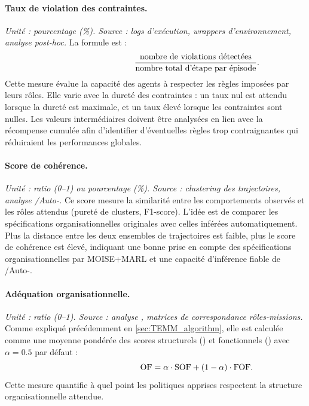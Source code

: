 \paragraph{Taux de violation des contraintes.}
\textit{Unité : pourcentage (\%). Source : logs d'exécution, wrappers d'environnement, analyse post-hoc.}
La formule est :
\[
  \hspace{3.5cm}\frac{\text{nombre de violations détectées}}{\text{nombre total d'étape par épisode}}.
\]
Cette mesure évalue la capacité des agents à respecter les règles imposées par leurs rôles.
Elle varie avec la dureté des contraintes : un taux nul est attendu lorsque la dureté est maximale, et un taux élevé lorsque les contraintes sont nulles.
Les valeurs intermédiaires doivent être analysées en lien avec la récompense cumulée afin d'identifier d'éventuelles règles trop contraignantes qui réduiraient les performances globales.

\paragraph{Score de cohérence.}
\textit{Unité : ratio (0–1) ou pourcentage (\%). Source : clustering des trajectoires, analyse /Auto-.}
Ce score mesure la similarité entre les comportements observés et les rôles attendus (pureté de clusters, F1-score).
L'idée est de comparer les spécifications organisationnelles originales avec celles inférées automatiquement.
Plus la distance entre les deux ensembles de trajectoires est faible, plus le score de cohérence est élevé, indiquant une bonne prise en compte des spécifications organisationnelles par MOISE+MARL et une capacité d'inférence fiable de /Auto-.

\paragraph{Adéquation organisationnelle.}
\textit{Unité : ratio (0–1). Source : analyse , matrices de correspondance rôles-missions.}
Comme expliqué précédemment en \autoref{sec:TEMM_algorithm}, elle est calculée comme une moyenne pondérée des scores structurels () et fonctionnels () avec $\alpha = 0.5$ par défaut :
\[
  \hspace{3.5cm}\text{OF} = \alpha \cdot \text{SOF} + (1-\alpha) \cdot \text{FOF}.
\]
Cette mesure quantifie à quel point les politiques apprises respectent la structure organisationnelle attendue.

